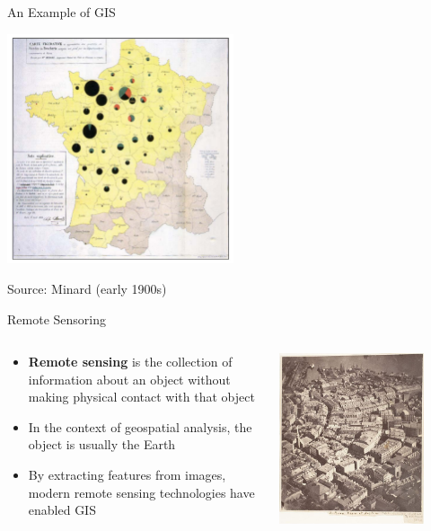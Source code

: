 \documentclass[notes, aspectratio=1610]{beamer}
\begin{document}
\begin{frame}{An Example of GIS}{}
	\centering 

	\includegraphics[width=0.5\textwidth]{images/example_of_gis.png}

	\small 

	Source: Minard (early 1900s)
\end{frame}

\begin{frame}{Remote Sensoring}{}
	\begin{columns}
		\begin{column}{0.5\textwidth}
		\begin{itemize}
			\item 
			\textbf{Remote sensing} is the collection of information about an 
			object without making physical contact with that object
			\item 
			In the context of geospatial analysis, the object is usually 
			the Earth
			\item 
			By extracting features from images, modern remote sensing 
			technologies have enabled GIS
		\end{itemize}
		\end{column}
		\begin{column}{0.5\textwidth}
		\centering
		\includegraphics[width=0.8\textwidth]{images/56914f0d6cbe4.jpeg}
		\end{column}
	\end{columns}
\end{frame}
\end{document}
